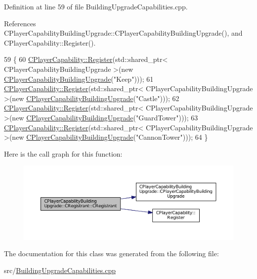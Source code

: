 Definition at line 59 of file Building\+Upgrade\+Capabilities.\+cpp.



References C\+Player\+Capability\+Building\+Upgrade\+::\+C\+Player\+Capability\+Building\+Upgrade(), and C\+Player\+Capability\+::\+Register().


\begin{DoxyCode}
59                                                         \{
60     \hyperlink{classCPlayerCapability_a7e298018dcde2684451add3cfff065f7}{CPlayerCapability::Register}(std::shared\_ptr<
       CPlayerCapabilityBuildingUpgrade >(\textcolor{keyword}{new} \hyperlink{classCPlayerCapabilityBuildingUpgrade_a80ccec4b17a9e43914bec537dcbe1b9e}{CPlayerCapabilityBuildingUpgrade}(\textcolor{stringliteral}{"Keep"})));   
61     \hyperlink{classCPlayerCapability_a7e298018dcde2684451add3cfff065f7}{CPlayerCapability::Register}(std::shared\_ptr<
       CPlayerCapabilityBuildingUpgrade >(\textcolor{keyword}{new} \hyperlink{classCPlayerCapabilityBuildingUpgrade_a80ccec4b17a9e43914bec537dcbe1b9e}{CPlayerCapabilityBuildingUpgrade}(\textcolor{stringliteral}{"Castle"})));
62     \hyperlink{classCPlayerCapability_a7e298018dcde2684451add3cfff065f7}{CPlayerCapability::Register}(std::shared\_ptr<
       CPlayerCapabilityBuildingUpgrade >(\textcolor{keyword}{new} \hyperlink{classCPlayerCapabilityBuildingUpgrade_a80ccec4b17a9e43914bec537dcbe1b9e}{CPlayerCapabilityBuildingUpgrade}(\textcolor{stringliteral}{"GuardTower"})));   
63     \hyperlink{classCPlayerCapability_a7e298018dcde2684451add3cfff065f7}{CPlayerCapability::Register}(std::shared\_ptr<
       CPlayerCapabilityBuildingUpgrade >(\textcolor{keyword}{new} \hyperlink{classCPlayerCapabilityBuildingUpgrade_a80ccec4b17a9e43914bec537dcbe1b9e}{CPlayerCapabilityBuildingUpgrade}(\textcolor{stringliteral}{"CannonTower"})));
64 \}
\end{DoxyCode}
Here is the call graph for this function\+:\nopagebreak
\begin{figure}[H]
\begin{center}
\leavevmode
\includegraphics[width=350pt]{classCPlayerCapabilityBuildingUpgrade_1_1CRegistrant_a85e216de0285430da642fa71f2a79a34_cgraph}
\end{center}
\end{figure}


The documentation for this class was generated from the following file\+:\begin{DoxyCompactItemize}
\item 
src/\hyperlink{BuildingUpgradeCapabilities_8cpp}{Building\+Upgrade\+Capabilities.\+cpp}\end{DoxyCompactItemize}
